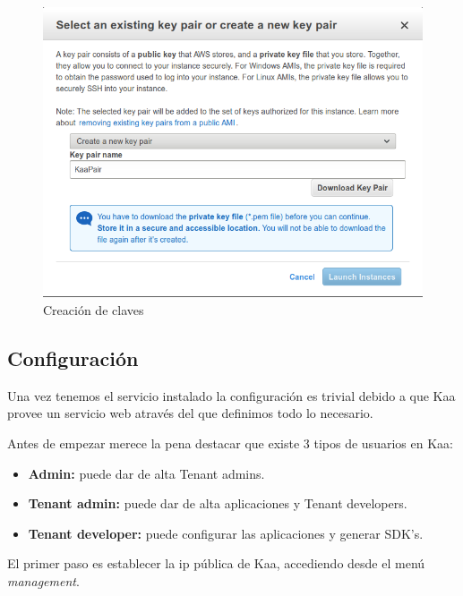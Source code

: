 \begin{figure}[!ht]
  \begin{center}
    \includegraphics[scale=0.45]{../images/kaa/7.png}
		\caption{Creación de claves}
    \label{fig:kaa}
	\end{center}
\end{figure}

\subsection{Configuración}

Una vez tenemos el servicio instalado la configuración es trivial debido a que Kaa provee un servicio web através del que definimos todo lo necesario.

Antes de empezar merece la pena destacar que existe 3 tipos de usuarios en Kaa:

\begin{itemize}
	\item \textbf{Admin: } puede dar de alta Tenant admins.
	\item \textbf{Tenant admin: } puede dar de alta aplicaciones y Tenant developers.
	\item \textbf{Tenant developer:} puede configurar las aplicaciones y generar SDK's.
\end{itemize}

\bigskip

El primer paso es establecer la ip pública de Kaa, accediendo desde el menú \textit{management}.

